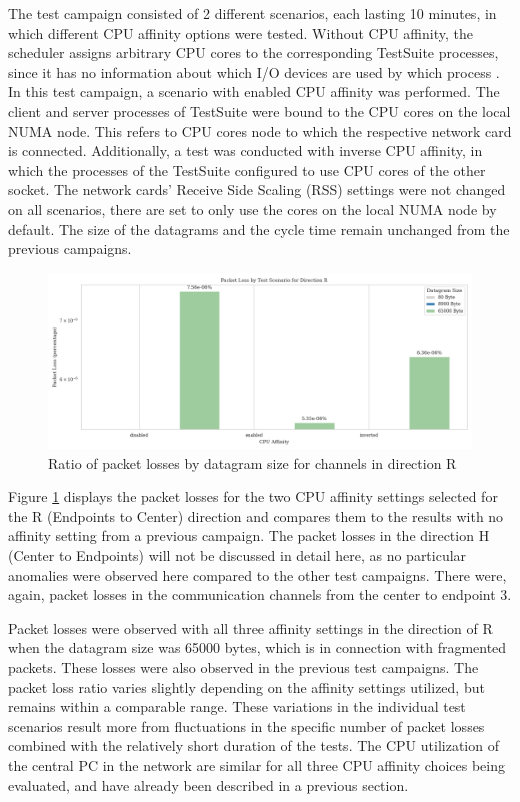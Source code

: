 \documentclass[	a4paper,
				11pt,
				DIV=11,
				bigheadings,
				idxtotoc,
				listof=totoc,	
				bibtotoc,		
				halfparskip,
				cleardoubleempty,
				oneside,
				openright]{scrartcl}
\begin{document}
The test campaign consisted of 2 different scenarios, each lasting 10 minutes, in which different CPU affinity options were tested. Without CPU affinity, the scheduler assigns arbitrary CPU cores to the corresponding TestSuite processes, since it has no information about which I/O devices are used by which process \cite{tbd}. In this test campaign, a scenario with enabled CPU affinity was performed. The client and server processes of TestSuite were bound to the CPU cores on the local NUMA node. This refers to CPU cores node to which the respective network card is connected. Additionally, a test was conducted with inverse CPU affinity, in which the processes of the TestSuite configured to use CPU cores of the other socket.  The network cards' Receive Side Scaling (RSS) settings were not changed on all scenarios, there are set to only use the cores on the local NUMA node by default. The size of the datagrams and the cycle time remain unchanged from the previous campaigns.

\begin{figure}[h]
	\includegraphics[width=\textwidth]{fig8.png}
	\centering
	\caption{Ratio of packet losses by datagram size for channels in direction R}
    \label{fig:fig8}
\end{figure}

Figure \ref{fig:fig8} displays the packet losses for the two CPU affinity settings selected for the R (Endpoints to Center) direction and compares them to the results with no affinity setting from a previous campaign. The packet losses in the direction H (Center to Endpoints) will not be discussed in detail here, as no particular anomalies were observed here compared to the other test campaigns. There were, again, packet losses in the communication channels from the center to endpoint 3.

Packet losses were observed with all three affinity settings in the direction of R when the datagram size was 65000 bytes, which is in connection with fragmented packets. These losses were also observed in the previous test campaigns.  The packet loss ratio varies slightly depending on the affinity settings utilized, but remains within a comparable range. These variations in the individual test scenarios result more from fluctuations in the specific number of packet losses combined with the relatively short duration of the tests. The CPU utilization of the central PC in the network are similar for all three CPU affinity choices being evaluated, and have already been described in a previous section.
\end{document}
